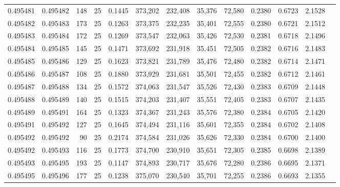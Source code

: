 \begin{tabular}{rrrrrrrrrrrrr}
0.495481 & 0.495482 &   148 &  25 &                                     0.1445 & 373,202 & 232,408 &  35,376 &  72,580 & 0.2380 & 0.6723 & 2.1528 \\
0.495482 & 0.495483 &   173 &  25 &                                     0.1263 & 373,375 & 232,235 &  35,401 &  72,555 & 0.2380 & 0.6721 & 2.1512 \\
0.495483 & 0.495484 &   172 &  25 &                                     0.1269 & 373,547 & 232,063 &  35,426 &  72,530 & 0.2381 & 0.6718 & 2.1496 \\
0.495484 & 0.495485 &   145 &  25 &                                     0.1471 & 373,692 & 231,918 &  35,451 &  72,505 & 0.2382 & 0.6716 & 2.1483 \\
0.495485 & 0.495486 &   129 &  25 &                                     0.1623 & 373,821 & 231,789 &  35,476 &  72,480 & 0.2382 & 0.6714 & 2.1471 \\
0.495486 & 0.495487 &   108 &  25 &                                     0.1880 & 373,929 & 231,681 &  35,501 &  72,455 & 0.2382 & 0.6712 & 2.1461 \\
0.495487 & 0.495488 &   134 &  25 &                                     0.1572 & 374,063 & 231,547 &  35,526 &  72,430 & 0.2383 & 0.6709 & 2.1448 \\
0.495488 & 0.495489 &   140 &  25 &                                     0.1515 & 374,203 & 231,407 &  35,551 &  72,405 & 0.2383 & 0.6707 & 2.1435 \\
0.495489 & 0.495491 &   164 &  25 &                                     0.1323 & 374,367 & 231,243 &  35,576 &  72,380 & 0.2384 & 0.6705 & 2.1420 \\
0.495491 & 0.495492 &   127 &  25 &                                     0.1645 & 374,494 & 231,116 &  35,601 &  72,355 & 0.2384 & 0.6702 & 2.1408 \\
0.495492 & 0.495492 &    90 &  25 &                                     0.2174 & 374,584 & 231,026 &  35,626 &  72,330 & 0.2384 & 0.6700 & 2.1400 \\
0.495492 & 0.495493 &   116 &  25 &                                     0.1773 & 374,700 & 230,910 &  35,651 &  72,305 & 0.2385 & 0.6698 & 2.1389 \\
0.495493 & 0.495495 &   193 &  25 &                                     0.1147 & 374,893 & 230,717 &  35,676 &  72,280 & 0.2386 & 0.6695 & 2.1371 \\
0.495495 & 0.495496 &   177 &  25 &                                     0.1238 & 375,070 & 230,540 &  35,701 &  72,255 & 0.2386 & 0.6693 & 2.1355 \\

\end{tabular}
